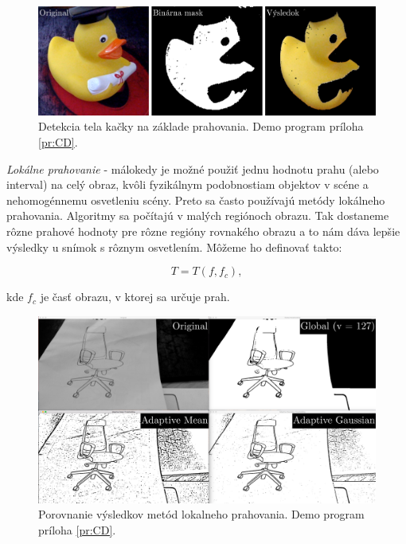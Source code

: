 \begin{figure}[H]
\begin{center}
	\includegraphics[scale=0.25]{images/trasholding_duck}
	\caption{Detekcia tela kačky na základe prahovania. Demo program príloha \ref{pr:CD}.}
	\end{center}
\end{figure}


\textit{Lokálne prahovanie} - málokedy je možné použiť jednu hodnotu prahu (alebo interval) na celý obraz, kvôli fyzikálnym podobnostiam objektov v scéne a nehomogénnemu osvetleniu scény. Preto sa často používajú metódy lokálneho prahovania. Algoritmy sa počítajú v malých regiónoch obrazu. Tak dostaneme rôzne prahové hodnoty pre rôzne regióny rovnakého obrazu a to nám dáva lepšie výsledky u snímok s rôznym osvetlením. Môžeme ho definovať takto: \cite{fit_trasholding}\cite{openCV_trasholding}

\begin{equation}
    T=T(f {,} f_c){,}
\end{equation}

kde $f_c$ je časť obrazu, v ktorej sa určuje prah. 

\begin{figure}[H]
\begin{center}
	\includegraphics[scale=0.13]{images/trasholding}
	\caption{Porovnanie výsledkov metód lokalneho prahovania. Demo program príloha \ref{pr:CD}.}
	\end{center}
\end{figure}




